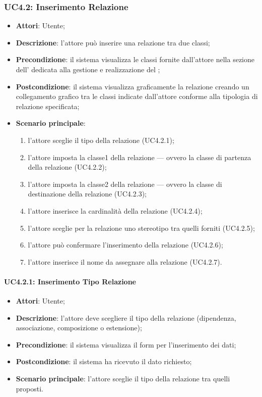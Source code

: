 \subsubsection{UC4.2: Inserimento Relazione}
\label{UC4.2}
\begin{itemize}
	\item \textbf{Attori}: Utente;
	\item \textbf{Descrizione}: l'attore può inserire una relazione tra due classi;
	\item \textbf{Precondizione}: il sistema visualizza le classi fornite dall'attore nella sezione dell' dedicata alla gestione e realizzazione del ;
	\item \textbf{Postcondizione}: il sistema visualizza graficamente la relazione creando un collegamento grafico tra le classi indicate dall'attore conforme alla tipologia di relazione specificata;
	\item \textbf{Scenario principale}:
	\begin{enumerate}
		\item l'attore sceglie il tipo della relazione (UC4.2.1);
		\item l'attore imposta la classe1 della relazione --- ovvero la classe di partenza della relazione (UC4.2.2);
		\item l'attore imposta la classe2 della relazione --- ovvero la classe di destinazione della relazione (UC4.2.3);
		\item l'attore inserisce la cardinalità della relazione (UC4.2.4);
		\item l'attore sceglie per la relazione uno stereotipo tra quelli forniti (UC4.2.5);
		\item l'attore può confermare l'inserimento della relazione (UC4.2.6);
		\item l'attore inserisce il nome da assegnare alla relazione (UC4.2.7).
	\end{enumerate}
\end{itemize}

\paragraph{UC4.2.1: Inserimento Tipo Relazione}
\label{UC4.2.1}
\begin{itemize}
	\item \textbf{Attori}: Utente;
	\item \textbf{Descrizione}: l'attore deve scegliere il tipo della relazione (dipendenza, associazione, composizione o estensione);
	\item \textbf{Precondizione}: il sistema visualizza il form per l'inserimento dei dati;
	\item \textbf{Postcondizione}: il sistema ha ricevuto il dato richiesto;
	\item \textbf{Scenario principale}: l'attore sceglie il tipo della relazione tra quelli proposti.
\end{itemize}

